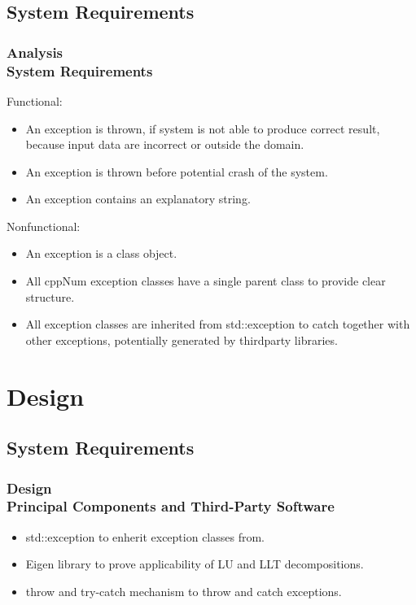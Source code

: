 \documentclass[ucs,10pt]{beamer}
\begin{document}
\subsection{System Requirements}

\begin{frame}
\frametitle{Analysis \\
	\small \color{rwth-blue} System Requirements}
	Functional:
	\begin{itemize}
		\item An exception is thrown, if system is not able to produce correct result, because input data are incorrect or outside the domain.
		\item An exception is thrown before potential crash of the system.
		\item An exception contains an explanatory string.
	\end{itemize}
	Nonfunctional:
	\begin{itemize}
		\item An exception is a class object.
		\item All cppNum exception classes have a single parent class to provide clear structure.
		\item All exception classes are inherited from std::exception to catch together with other exceptions, potentially generated by thirdparty libraries.
	\end{itemize}
\end{frame}

\section{Design}

\subsection{System Requirements}

\begin{frame}
\frametitle{Design \\
	\small \color{rwth-blue} Principal Components and Third-Party Software}
	\begin{itemize}
		\item std::exception to enherit exception classes from.
		\item Eigen library to prove applicability of LU and LLT decompositions.
		\item throw and try-catch mechanism to throw and catch exceptions.
	\end{itemize}
\end{frame}
\end{document}

